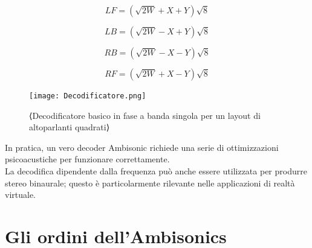 \begin{equation}
      LF = ({\sqrt{2W}} + X + Y){\sqrt{8}}
\end{equation}

\begin{equation}
      LB = ({\sqrt{2W}} - X + Y){\sqrt{8}}
\end{equation}

\begin{equation}
      RB = ({\sqrt{2W}} - X - Y){\sqrt{8}}
\end{equation}

\begin{equation}
      RF = ({\sqrt{2W}} + X - Y){\sqrt{8}}
\end{equation}

\begin{figure}[h]
      \centering
      \texttt{[image: Decodificatore.png]}
      \caption{⟨Decodificatore basico in fase a banda singola per un layout di altoparlanti quadrati⟩}
      \label{fig:⟨etichetta⟩}
      \end{figure}

      In pratica, un vero decoder Ambisonic richiede una serie di ottimizzazioni psicoacustiche per funzionare correttamente.\\
      La decodifica dipendente dalla frequenza può anche essere utilizzata per produrre stereo binaurale;
      questo è particolarmente rilevante nelle applicazioni di realtà virtuale.
      
      \section{Gli ordini dell'Ambisonics}

